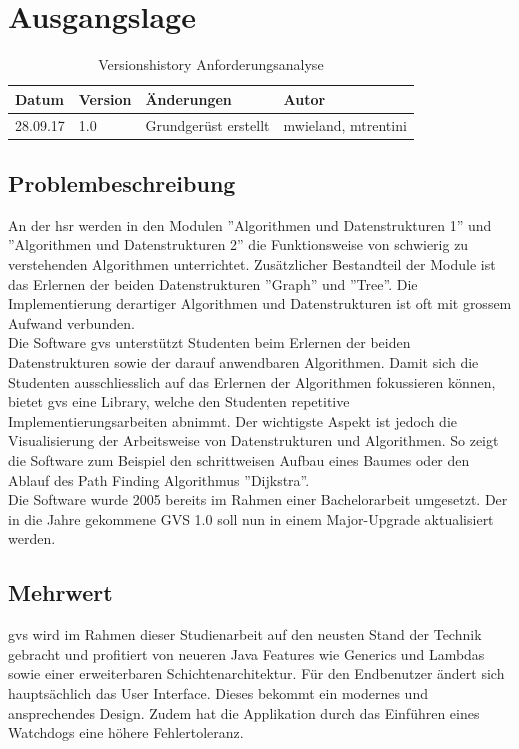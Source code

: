\documentclass[11pt,a4paper,english,oneside]{book}
\numberwithin{equation}{chapter}
\begin{document}
	
	\newpage
	
	
	\chapter{Ausgangslage}
	
	
	\begin{table}[h!]
		\centering
		\begin{tabularx}{\linewidth}{l l X l}
			\toprule 
			Datum & Version & Änderungen & Autor \\
			\midrule
			28.09.17 & 1.0 & Grundgerüst erstellt & mwieland, mtrentini \\
			\bottomrule 
		\end{tabularx} 
		\caption{Versionshistory Anforderungsanalyse} 
	\end{table}
	
	
	\section{Problembeschreibung}
	An der \gls{hsr} werden in den Modulen ''Algorithmen und Datenstrukturen 1'' und ''Algorithmen und Datenstrukturen 2'' die Funktionsweise von schwierig zu verstehenden Algorithmen unterrichtet. Zusätzlicher Bestandteil der Module ist das Erlernen der beiden Datenstrukturen ''Graph'' und ''Tree''. Die Implementierung derartiger Algorithmen und Datenstrukturen ist oft mit grossem Aufwand verbunden. \\
	Die Software \gls{gvs} unterstützt Studenten beim Erlernen der beiden Datenstrukturen sowie der darauf anwendbaren Algorithmen. Damit sich die Studenten ausschliesslich auf das Erlernen der Algorithmen fokussieren können, bietet \gls{gvs} eine Library, welche den Studenten repetitive Implementierungsarbeiten abnimmt. Der wichtigste Aspekt ist jedoch die Visualisierung der Arbeitsweise von Datenstrukturen und Algorithmen. So zeigt die Software zum Beispiel den schrittweisen Aufbau eines Baumes oder den Ablauf des Path Finding Algorithmus ''Dijkstra''. \\
	Die Software wurde 2005 bereits im Rahmen einer Bachelorarbeit umgesetzt. Der in die Jahre gekommene GVS 1.0 soll nun in einem Major-Upgrade aktualisiert werden.
	
	\section{Mehrwert}
	\gls{gvs} wird im Rahmen dieser Studienarbeit auf den neusten Stand der Technik gebracht und profitiert von neueren Java Features wie Generics und Lambdas sowie einer erweiterbaren Schichtenarchitektur. 
	Für den Endbenutzer ändert sich hauptsächlich das User Interface. Dieses bekommt ein modernes und ansprechendes Design. Zudem hat die Applikation durch das Einführen eines Watchdogs eine höhere Fehlertoleranz. 
	
\end{document}
